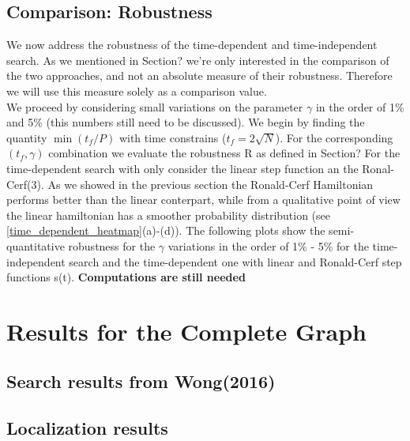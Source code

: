     \subsection{Comparison: Robustness}
    We now address the robustness of the time-dependent and time-independent search. As we mentioned in Section? we're only interested in the comparison of the two approaches, and not an absolute measure of their robustness. Therefore we will use this measure solely as a comparison value. \\
    We proceed by considering small variations on the parameter $\gamma$ in the order of 1\% and 5\% (this numbers still need to be discussed). We begin by finding the quantity $\min(t_f/P)$ with time constrains ($t_f = 2\sqrt{N}$). For the corresponding $(t_f,\gamma)$ combination we evaluate the robustness R as defined in Section?
    For the time-dependent search with only consider the linear step function an the Ronal-Cerf(3). As we showed in the previous section the Ronald-Cerf Hamiltonian performs better than the linear conterpart, while from a qualitative point of view the linear hamiltonian has a smoother probability distribution (see \cref{time_dependent_heatmap}(a)-(d)). The following plots show the semi-quantitative robustness for the $\gamma$ variations in the order of 1\% - 5\% for the time-independent search and the time-dependent one with linear and Ronald-Cerf step functions s(t). \textbf{Computations are still needed}

    


\section{Results for the Complete Graph}
    \subsection{Search results from Wong(2016)}
    \subsection{Localization results}
